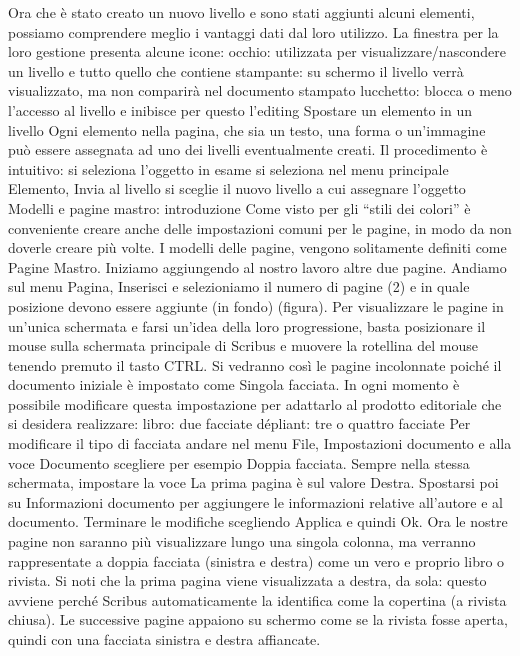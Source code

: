 \documentclass[a4paper, 12pt]{book}
\begin{document}
Ora che è stato creato un nuovo livello e sono stati aggiunti alcuni  elementi, possiamo comprendere meglio i vantaggi dati dal loro utilizzo. La finestra per la loro gestione presenta alcune icone:
occhio: utilizzata per visualizzare/nascondere un livello e tutto quello che contiene
stampante: su schermo il livello verrà visualizzato, ma non comparirà nel documento stampato
lucchetto: blocca o meno l'accesso al livello e inibisce per questo l'editing
Spostare un elemento in un livello
Ogni elemento nella pagina, che sia un testo, una forma o un'immagine può essere assegnata ad uno dei livelli eventualmente creati. Il procedimento è intuitivo:
si seleziona l'oggetto in esame
si seleziona nel menu principale Elemento, Invia al livello
si sceglie il nuovo livello a cui assegnare l'oggetto
Modelli e pagine mastro: introduzione
Come visto per gli “stili dei colori” è conveniente creare anche delle impostazioni comuni per le pagine, in modo da non doverle creare più volte. I modelli delle pagine, vengono solitamente definiti come Pagine Mastro.
Iniziamo aggiungendo al nostro lavoro altre due pagine. Andiamo sul menu Pagina, Inserisci e selezioniamo il numero di pagine (2) e in quale posizione devono essere aggiunte (in fondo) (figura). Per visualizzare le pagine in un'unica schermata e farsi un'idea della loro progressione, basta posizionare il mouse sulla schermata principale di Scribus e muovere la rotellina del mouse  tenendo premuto il tasto CTRL. Si vedranno così le pagine incolonnate poiché il documento iniziale è impostato come Singola facciata. In ogni momento è possibile modificare questa impostazione per adattarlo al prodotto editoriale che si desidera realizzare:
libro: due facciate
dépliant: tre o quattro facciate
Per modificare il tipo di facciata andare nel menu File, Impostazioni documento e alla voce Documento scegliere per esempio Doppia facciata.  Sempre nella stessa schermata, impostare la voce La prima pagina è sul valore Destra. Spostarsi poi su Informazioni documento per aggiungere le informazioni relative all'autore e al documento. Terminare le modifiche scegliendo Applica e quindi Ok. 
Ora le nostre pagine non saranno più visualizzare lungo una singola colonna, ma verranno rappresentate a doppia facciata (sinistra e destra) come un vero e proprio libro o rivista. Si noti che la prima pagina viene visualizzata a destra, da sola: questo avviene perché Scribus automaticamente la identifica come la copertina (a rivista chiusa). Le successive pagine appaiono su schermo come se la rivista fosse aperta, quindi con una facciata sinistra e destra affiancate.
\end{document}
